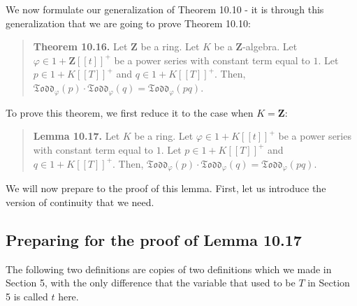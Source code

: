 \documentclass[numbers=enddot,12pt,final,onecolumn,notitlepage]{scrartcl}%
\begin{document}
We now formulate our generalization of Theorem 10.10 - it is through this
generalization that we are going to prove Theorem 10.10:

\begin{quote}
\textbf{Theorem 10.16.} Let $\mathbf{Z}$ be a ring. Let $K$ be a $\mathbf{Z}%
$-algebra. Let $\varphi\in1+\mathbf{Z}\left[  \left[  t\right]  \right]  ^{+}$
be a power series with constant term equal to $1$. Let $p\in1+K\left[  \left[
T\right]  \right]  ^{+}$ and $q\in1+K\left[  \left[  T\right]  \right]  ^{+}$.
Then, $\mathfrak{Todd}_{\varphi}\left(  p\right)  \cdot\mathfrak{Todd}%
_{\varphi}\left(  q\right)  =\mathfrak{Todd}_{\varphi}\left(  pq\right)  $.
\end{quote}

To prove this theorem, we first reduce it to the case when $K=\mathbf{Z}$:

\begin{quote}
\textbf{Lemma 10.17.} Let $K$ be a ring. Let $\varphi\in1+K\left[  \left[
t\right]  \right]  ^{+}$ be a power series with constant term equal to $1$.
Let $p\in1+K\left[  \left[  T\right]  \right]  ^{+}$ and $q\in1+K\left[
\left[  T\right]  \right]  ^{+}$. Then, $\mathfrak{Todd}_{\varphi}\left(
p\right)  \cdot\mathfrak{Todd}_{\varphi}\left(  q\right)  =\mathfrak{Todd}%
_{\varphi}\left(  pq\right)  $.
\end{quote}

We will now prepare to the proof of this lemma. First, let us introduce the
version of continuity that we need.

\subsection{Preparing for the proof of Lemma 10.17}

The following two definitions are copies of two definitions which we made in
Section 5, with the only difference that the variable that used to be $T$ in
Section 5 is called $t$ here.
\end{document}

